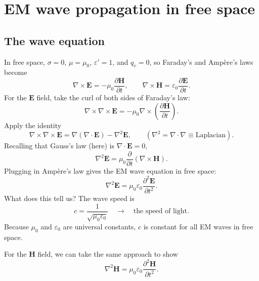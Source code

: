 \documentclass[11pt, oneside]{article}
\begin{document}
\section{EM wave propagation in free space}

\subsection{The wave equation}

In free space, $\sigma = 0$, $\mu = \mu_0$, $\varepsilon' = 1$, and $q_v = 0$, so Faraday's and Amp\`ere's laws become
\begin{equation}
	\nabla\times\mathbf{E} = -\mu_0\frac{\partial\mathbf{H}}{\partial t},
	\qquad
	\nabla\times\mathbf{H} = \varepsilon_0\frac{\partial\mathbf{E}}{\partial t}.
\end{equation}
For the $\mathbf{E}$ field, take the curl of both sides of Faraday's law:
\begin{equation}
	\nabla\times\nabla\times\mathbf{E} = -\mu_0\nabla\times\left(\frac{\partial\mathbf{H}}{\partial t}\right).
\end{equation}
Apply the identity
\begin{equation}
	\nabla\times\nabla\times\mathbf{E} = \nabla(\nabla\cdot\mathbf{E}) - \nabla^2\mathbf{E},
	\qquad (\nabla^2 = \nabla\cdot\nabla \equiv \text{Laplacian}).
\end{equation}
Recalling that Gauss's law (here) is $\nabla\cdot\mathbf{E} = 0$,
\begin{equation}
	\nabla^2\mathbf{E} = \mu_0\frac{\partial}{\partial t}(\nabla\times\mathbf{H}).
\end{equation}
Plugging in Amp\`ere's law gives the EM wave equation in free space:
\begin{equation}
	\label{e:wave_free}
	\nabla^2\mathbf{E} = \mu_0\varepsilon_0\frac{\partial^2\mathbf{E}}{\partial t^2}.
\end{equation}
What does this tell us? The wave speed is
\begin{equation}
	c = \frac{1}{\sqrt{\mu_0\varepsilon_0}} \quad \rightarrow \quad \text{the speed of light}.
\end{equation}
Because $\mu_0$ and $\varepsilon_0$ are universal constants, $c$ is constant for all EM waves in free space.

For the $\mathbf{H}$ field, we can take the same approach to show
\begin{equation}
	\nabla^2\mathbf{H} = \mu_0\varepsilon_0\frac{\partial^2\mathbf{H}}{\partial t^2}.
\end{equation}
\end{document}
